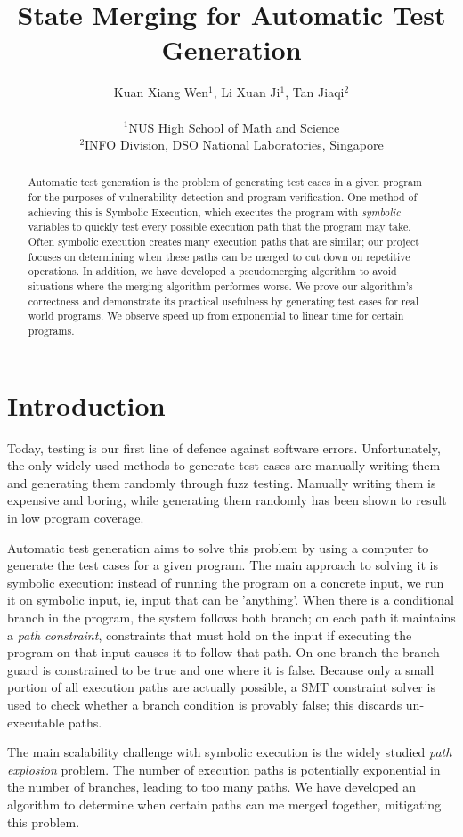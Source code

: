 \documentclass[12pt,a4paper]{article}
\title{State Merging for Automatic Test Generation}
\date{}
\author{
Kuan Xiang Wen$^{1}$, Li Xuan Ji$^{1}$, Tan Jiaqi$^{2}$\\
\vspace{1 mm} \\
\small{$^{1}$NUS High School of Math and Science}\\
\small{$^{2}$INFO Division, DSO National Laboratories, Singapore}
}
\begin{document}
\begin{abstract}
Automatic test generation is the problem of generating test cases in a given program for the purposes of vulnerability detection and program verification. One method of achieving this is Symbolic Execution, which executes the program with \emph{symbolic} variables to quickly test every possible execution path that the program may take. Often symbolic execution creates many execution paths that are similar; our project focuses on determining when these paths can be merged to cut down on repetitive operations. In addition, we have developed a pseudomerging algorithm to avoid situations where the merging algorithm performes worse. We prove our algorithm's correctness and demonstrate its practical usefulness by generating test cases for real world programs. We observe speed up from exponential to linear time for certain programs.
\end{abstract}

\section{Introduction}
Today, testing is our first line of defence against software errors. Unfortunately, the only widely used methods to generate test cases are manually writing them and generating them randomly through fuzz testing. Manually writing them is expensive and boring, while generating them randomly has been shown to result in low program coverage. 

Automatic test generation aims to solve this problem by using a computer to generate the test cases for a given program. The main approach to solving it is symbolic execution: instead of running the program on a concrete input, we run it on symbolic input, ie, input that can be 'anything'. When there is a conditional branch in the program, the system follows both branch; on each path it maintains a \emph{path constraint}, constraints that must hold on the input if executing the program on that input causes it to follow that path. On one branch the branch guard is constrained to be true and one where it is false. Because only a small portion of all execution paths are actually possible, a SMT constraint solver is used to check whether a branch condition is provably false; this discards un-executable paths.

The main scalability challenge with symbolic execution is the widely studied \emph{path explosion} problem. The number of execution paths is potentially exponential in the number of branches, leading to too many paths. We have developed an algorithm to determine when certain paths can me merged together, mitigating this problem.
\end{document}
